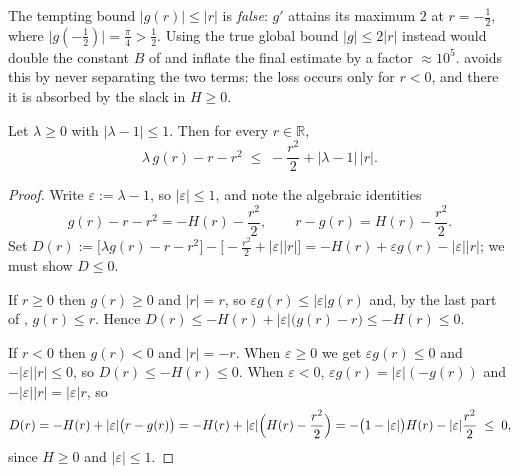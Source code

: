\begin{remark}
\label{rem:rs_arctan_trap}
The tempting bound $\lvert g(r)\rvert\le\lvert r\rvert$ is \emph{false}: $g'$ attains its
maximum $2$ at $r=-\tfrac12$, where $\lvert g(-\tfrac12)\rvert=\tfrac\pi4>\tfrac12$.  Using
the true global bound $\lvert g\rvert\le2\lvert r\rvert$ instead would double the constant
$B$ of  and inflate the final estimate by a factor $\approx10^{5}$.
 avoids this by never separating the two terms: the loss
occurs only for $r<0$, and there it is absorbed by the slack in $H\ge0$.
\end{remark}

\begin{lemma}
\label{lem:rs_arctan_perturbed}
\leanok
{}
Let $\lambda\ge0$ with $\lvert\lambda-1\rvert\le1$.  Then for every $r\in\mathbb{R}$,
\[
  \lambda\,g(r)-r-r^{2}\;\le\;-\frac{r^{2}}2+\lvert\lambda-1\rvert\,\lvert r\rvert .
\]
\end{lemma}

\begin{proof}
\leanok
Write $\varepsilon:=\lambda-1$, so $\lvert\varepsilon\rvert\le1$, and note the algebraic
identities
\[
  g(r)-r-r^{2}=-H(r)-\frac{r^{2}}2,\qquad r-g(r)=H(r)-\frac{r^{2}}2 .
\]
Set $D(r):=\bigl[\lambda g(r)-r-r^{2}\bigr]-\bigl[-\tfrac{r^{2}}2+\lvert\varepsilon\rvert\lvert r\rvert\bigr]
=-H(r)+\varepsilon g(r)-\lvert\varepsilon\rvert\lvert r\rvert$; we must show $D\le0$.

If $r\ge0$ then $g(r)\ge0$ and $\lvert r\rvert=r$, so
$\varepsilon g(r)\le\lvert\varepsilon\rvert g(r)$ and, by the last part of
, $g(r)\le r$.  Hence
$D(r)\le-H(r)+\lvert\varepsilon\rvert\bigl(g(r)-r\bigr)\le-H(r)\le0$.

If $r<0$ then $g(r)<0$ and $\lvert r\rvert=-r$.  When $\varepsilon\ge0$ we get
$\varepsilon g(r)\le0$ and $-\lvert\varepsilon\rvert\lvert r\rvert\le 0$, so
$D(r)\le-H(r)\le0$.  When $\varepsilon<0$, $\varepsilon g(r)=\lvert\varepsilon\rvert(-g(r))$
and $-\lvert\varepsilon\rvert\lvert r\rvert=\lvert\varepsilon\rvert r$, so
\[
  D(r)=-H(r)+\lvert\varepsilon\rvert\bigl(r-g(r)\bigr)
      =-H(r)+\lvert\varepsilon\rvert\Bigl(H(r)-\frac{r^{2}}2\Bigr)
      =-\bigl(1-\lvert\varepsilon\rvert\bigr)H(r)-\lvert\varepsilon\rvert\frac{r^{2}}2\;\le\;0,
\]
since $H\ge0$ and $\lvert\varepsilon\rvert\le1$.
\end{proof}

